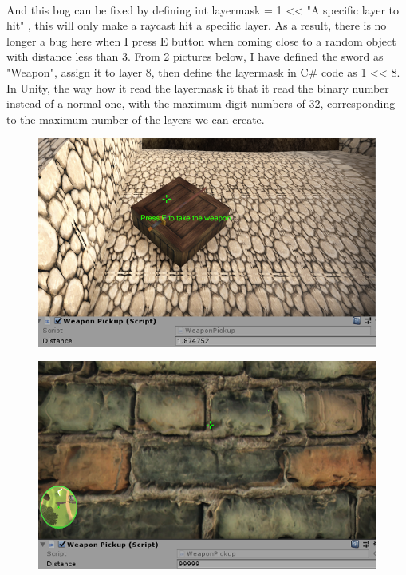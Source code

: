 \documentclass[a4paper, 13pt]{extarticle}
\begin{document}
{\begin{figure}[h]
\begin{minipage}{.5\textwidth}
			\label{fig:test40}
			\centering
		\end{minipage}
	\end{figure} \\
	And this bug can be fixed by defining int layermask = 1 << "A specific layer to hit" , this will only make a raycast hit a specific layer. As a result, there is no longer a bug here when I press E button when coming close to a random object with distance less than 3. From 2 pictures below, I have defined the sword as "Weapon", assign it to layer 8, then define the layermask in C\# code as 1 << 8. In Unity, the way how it read the layermask it that it read the binary number instead of a normal one, with the maximum digit numbers of 32, corresponding to the maximum number of the layers we can create. 
	 \begin{figure}[h!]
	 	\begin{minipage}{.5\textwidth}
	 		\centering
	 		\includegraphics[width=1\linewidth]{intructions/it_works1.png}
	 		\label{fig:test41}
	 	\end{minipage}
 		\begin{minipage}{.5\textwidth}
 		\centering
 		\includegraphics[width=1\linewidth]{intructions/it_works2.png}

\end{minipage}
\end{figure}}
\end{document}
